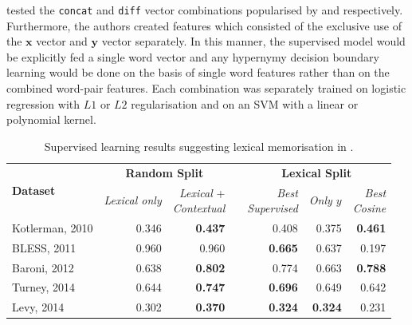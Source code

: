 \citet{levy2015supervised} tested the 
\texttt{concat} and \texttt{diff} vector combinations popularised by \citet{baroni2012entailment} and \citet{roller2014inclusive} respectively.  Furthermore, the authors created features which consisted of the exclusive use of the $\bm{x}$ vector and $\bm{y}$ vector separately.  In this manner, the supervised model would be explicitly fed a single word vector and any hypernymy decision boundary learning would be done on the basis of single word features rather than on the combined word-pair features.  Each combination was separately trained on logistic regression with $L1$ or $L2$ regularisation and on an \ac{SVM} with a linear or polynomial kernel.
\begin{table}\centering
    \begin{tabular}{@{}lrrcrrr@{}} \toprule
    \multirow{2}{*}{\textbf{Dataset}} & \multicolumn{2}{c}{\textbf{Random Split}} & \phantom{ab} & \multicolumn{3}{c}{\textbf{Lexical Split}} \\ 
    \cmidrule{2-3} \cmidrule{5-7} 
    & \textit{Lexical only} & \shortstack[r]{\textit{Lexical} +\\\textit{Contextual}} && \shortstack[r]{\textit{Best}\\\textit{Supervised}} & \textit{Only $y$} & \shortstack[r]{\textit{Best}\\\textit{Cosine}} \\ \midrule
    Kotlerman, 2010 & 0.346 & \textbf{0.437} && 0.408 & 0.375 & \textbf{0.461} \\
    BLESS, 2011 & 0.960 & 0.960 && \textbf{0.665} & 0.637 & 0.197 \\
    Baroni, 2012 & 0.638 & \textbf{0.802}  && 0.774 & 0.663 & \textbf{0.788} \\
    Turney, 2014 & 0.644 & \textbf{0.747} && \textbf{0.696} & 0.649 & 0.642 \\
    Levy, 2014 & 0.302 & \textbf{0.370} && \textbf{0.324} & \textbf{0.324} & 0.231 \\
    \bottomrule
    \end{tabular}
    \caption[Supervised learning results suggesting lexical memorisation.]{Supervised learning results suggesting lexical memorisation in \citep{levy2015supervised}.}\label{tab:levy_lexical_memo}
\end{table}

